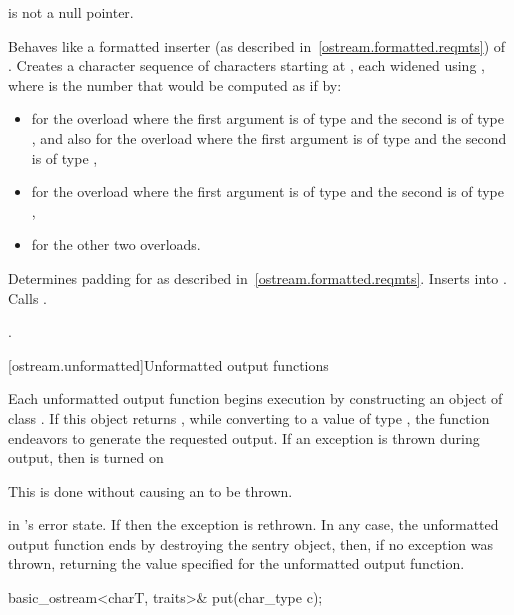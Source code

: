 \begin{itemdescr}
\pnum
\expects
{} is not a null pointer.

\pnum
\effects
Behaves like a formatted inserter (as described in~\ref{ostream.formatted.reqmts}) of .
Creates a character sequence  of  characters
starting at , each widened using
,
where  is the number that would be computed as if by:
\begin{itemize}
\item
{}
for the overload where the first argument is of type
and the second is of type
,
and also for the overload where the first argument is of type
and the second is of type
,
\item
{}
for the overload where the first argument is of type
and the second is of type
,
\item
{}
for the other two overloads.
\end{itemize}
Determines padding for  as described
in~\ref{ostream.formatted.reqmts}. Inserts  into
. Calls .

\pnum
\returns
{}.
\end{itemdescr}

[ostream.unformatted]{Unformatted output functions}

\pnum
Each
unformatted
output function begins execution by constructing an object of class
.
If this object returns
,
while converting to a value of type
,
the function endeavors
to generate the requested output.
If an exception is thrown during output, then
is turned on
\begin{footnote}
This is done without causing an
to be thrown.
\end{footnote}
in
's
error state.
If
then the exception is rethrown.
In any case, the unformatted output function ends by destroying the
sentry object, then, if no exception was thrown, returning the value
specified for the unformatted output function.

%
\begin{itemdecl}
basic_ostream<charT, traits>& put(char_type c);
\end{itemdecl}

